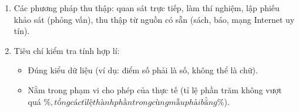 \begin{enumerate}
\item Các phương pháp thu thập: quan sát trực tiếp, làm thí nghiệm, lập phiếu khảo sát (phỏng vấn), thu thập từ nguồn có sẵn (sách, báo, mạng Internet uy tín).
\item Tiêu chí kiểm tra tính hợp lí:
\begin{itemize}
\item Đúng kiểu dữ liệu (ví dụ: điểm số phải là số, không thể là chữ).
\item Nằm trong phạm vi cho phép của thực tế (tỉ lệ phần trăm không vượt quá \%$, tổng các tỉ lệ thành phần trong cùng mẫu phải bằng \%$).
\end{itemize}
\end{enumerate}
